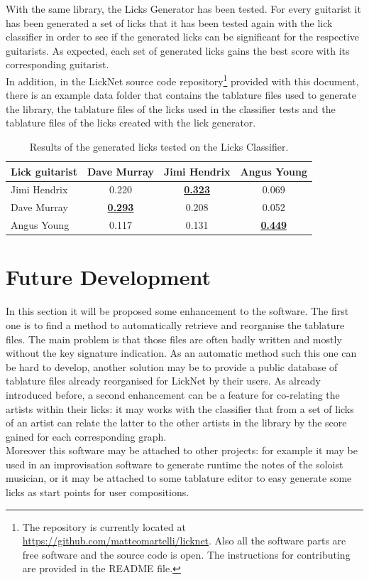\documentclass{llncs}
\begin{document}
With the same library, the Licks Generator has been tested. For every
guitarist it has been generated a set of licks that it has been tested
again with the lick classifier in order to see if the generated licks
can be significant for the respective guitarists. As expected, each set
of generated licks gains the best score with its corresponding
guitarist.\\
In addition, in the LickNet source code repository\footnote{The
repository is currently located at
\url{https://github.com/matteomartelli/licknet}. Also all the software
parts are free software and the source code is open. The instructions
for contributing are provided in the README file.}
 provided with this document,
there is an example data folder that contains the tablature files used
to generate the library, the tablature files of the licks used in the
classifier tests and the tablature files of the licks created with the
lick generator.
\begin{table}
\begin{center}
  \begin{tabular}{ l c c c }
    \hline
    Lick guitarist  & Dave Murray & Jimi Hendrix & Angus Young  \\ \hline
	Jimi Hendrix & 0.220 & \underline{\textbf{0.323}} & 0.069 \\
    Dave Murray & \underline{\textbf{0.293}} & 0.208 & 0.052 \\
	Angus Young & 0.117 & 0.131 & \underline{\textbf{0.449}} \\
  \end{tabular}
\end{center}
\caption{Results of the generated licks tested on the Licks Classifier.}
\label{tab:classifier}
\end{table}

\section{Future Development}
In this section it will be proposed some enhancement to the software.
The first one is to find a method to automatically retrieve and
reorganise the tablature files. The main problem is that those files are
often badly written and mostly without the key signature indication. As
an automatic method such this one can be hard to develop, another solution
may be to provide a public database of tablature files already
reorganised for LickNet by their users.
As already introduced before, a second enhancement can be a feature for
co-relating the artists within their licks: it may works with the
classifier that from a set of licks of an artist can relate the latter
to the other artists in the library by the score gained for each
corresponding graph.\\
Moreover this software may be attached to other projects: for example it may be used 
in an improvisation software to generate runtime the notes of the
soloist musician, or it may be attached to some tablature editor to easy
generate some licks as start points for user compositions.
\end{document}
